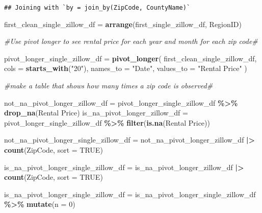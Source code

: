\documentclass[
]{article}
\newenvironment{Shaded}{\begin{snugshade}}{\end{snugshade}}
\newcommand{\AttributeTok}[1]{\textcolor[rgb]{0.13,0.29,0.53}{#1}}
\newcommand{\CommentTok}[1]{\textcolor[rgb]{0.56,0.35,0.01}{\textit{#1}}}
\newcommand{\ConstantTok}[1]{\textcolor[rgb]{0.56,0.35,0.01}{#1}}
\newcommand{\DecValTok}[1]{\textcolor[rgb]{0.00,0.00,0.81}{#1}}
\newcommand{\FunctionTok}[1]{\textcolor[rgb]{0.13,0.29,0.53}{\textbf{#1}}}
\newcommand{\NormalTok}[1]{#1}
\newcommand{\OtherTok}[1]{\textcolor[rgb]{0.56,0.35,0.01}{#1}}
\newcommand{\SpecialCharTok}[1]{\textcolor[rgb]{0.81,0.36,0.00}{\textbf{#1}}}
\newcommand{\StringTok}[1]{\textcolor[rgb]{0.31,0.60,0.02}{#1}}
\begin{document}
\begin{verbatim}
## Joining with `by = join_by(ZipCode, CountyName)`
\end{verbatim}

\begin{Shaded}
\begin{Highlighting}[]
\NormalTok{first\_clean\_single\_zillow\_df }\OtherTok{=} \FunctionTok{arrange}\NormalTok{(first\_single\_zillow\_df, RegionID)}

\CommentTok{\#Use pivot longer to see rental price for each year and month for each zip code\#}

\NormalTok{pivot\_longer\_single\_zillow\_df }\OtherTok{=} \FunctionTok{pivot\_longer}\NormalTok{(}
\NormalTok{  first\_clean\_single\_zillow\_df, }\AttributeTok{cols =} \FunctionTok{starts\_with}\NormalTok{(}\StringTok{"20"}\NormalTok{),}
  \AttributeTok{names\_to =} \StringTok{"Date"}\NormalTok{,}
  \AttributeTok{values\_to =} \StringTok{"Rental Price"}
\NormalTok{)}

\CommentTok{\#make a table that shows how many times a zip code is observed\#}

\NormalTok{not\_na\_pivot\_longer\_zillow\_df }\OtherTok{=}\NormalTok{ pivot\_longer\_single\_zillow\_df }\SpecialCharTok{\%\textgreater{}\%} \FunctionTok{drop\_na}\NormalTok{(}\StringTok{\textasciigrave{}}\AttributeTok{Rental Price}\StringTok{\textasciigrave{}}\NormalTok{)}
\NormalTok{is\_na\_pivot\_longer\_zillow\_df }\OtherTok{=}\NormalTok{ pivot\_longer\_single\_zillow\_df }\SpecialCharTok{\%\textgreater{}\%} \FunctionTok{filter}\NormalTok{(}\FunctionTok{is.na}\NormalTok{(}\StringTok{\textasciigrave{}}\AttributeTok{Rental Price}\StringTok{\textasciigrave{}}\NormalTok{))}

\NormalTok{not\_na\_pivot\_longer\_single\_zillow\_df }\OtherTok{=} 
\NormalTok{  not\_na\_pivot\_longer\_zillow\_df }\SpecialCharTok{|\textgreater{}} \FunctionTok{count}\NormalTok{(ZipCode, }\AttributeTok{sort =} \ConstantTok{TRUE}\NormalTok{)}

\NormalTok{is\_na\_pivot\_longer\_single\_zillow\_df }\OtherTok{=}
\NormalTok{  is\_na\_pivot\_longer\_zillow\_df }\SpecialCharTok{|\textgreater{}} \FunctionTok{count}\NormalTok{(ZipCode, }\AttributeTok{sort =} \ConstantTok{TRUE}\NormalTok{)}

\NormalTok{is\_na\_pivot\_longer\_single\_zillow\_df }\OtherTok{=}\NormalTok{ is\_na\_pivot\_longer\_single\_zillow\_df }\SpecialCharTok{\%\textgreater{}\%} \FunctionTok{mutate}\NormalTok{(}\AttributeTok{n =} \DecValTok{0}\NormalTok{)}


\end{Highlighting}
\end{Shaded}
\end{document}
